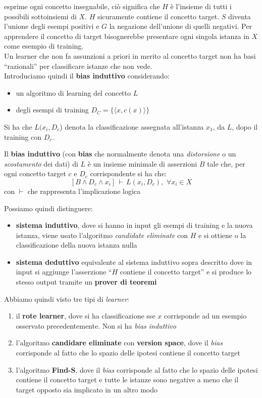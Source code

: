 \documentclass[a4paper,12pt, oneside]{book}
\begin{document}
esprime ogni concetto insegnabile, ciò significa che $H$ è l'insieme di tutti i
possibili sottoinsiemi di $X$. $H$ sicuramente contiene il concetto target. $S$
diventa l'unione degli esempi positivi e $G$ la negazione dell'unione di quelli
negativi. Per apprendere il concetto di target bisognerebbe presentare ogni
singola istanza in $X$ come esempio di training.\\
Un learner che non fa assunzioni a priori in merito al concetto target non ha
basi ``razionali'' per classificare istanze che non vede.\\
Introduciamo quindi il \textbf{bias induttivo} considerando:
\begin{itemize}
  \item un algoritmo di learning del concetto $L$
  \item degli esempi di training $D_C=\{\langle x,c(x)\rangle\}$
\end{itemize}
Si ha che $L(x_i,D_c$) denota la classificazione assegnata all'istanza $x_1$, da
$L$, dopo il training con $D_c$.
\begin{definizione}
  Il \textbf{bias induttivo} (con \textbf{bias} che normalmente denota una
  \emph{distorsione} o un \emph{scostamento} dei dati) di $L$ è un insieme
  minimale di asserzioni $B$ tale 
  che, per ogni concetto target $c$ e $D_c$ corrispondente si ha che:
  \[[B\land D_c\land x_i]\,\vdash\,L(x_i,D_c),\,\,\forall x_i\in X\]
  con $\vdash$ che rappresenta l'implicazione logica
\end{definizione}
Possiamo quindi distinguere:
\begin{itemize}
  \item \textbf{sistema induttivo}, dove si hanno in input gli esempi di
  training e la nuova istanza, viene usato l'algoritmo \textit{candidate
    eliminate} con $H$ e si ottiene o la classificazione della nuova istanza
  nulla
  \item \textbf{sistema deduttivo} equivalente al sistema induttivo sopra
  descritto dove in input si aggiunge l'asserzione ``$H$ contiene il concetto
  target'' e si produce lo stesso output tramite un \textbf{prover di teoremi}
\end{itemize}
Abbiamo quindi visto tre tipi di \textit{learner}:
\begin{enumerate}
  \item il \textbf{rote learner}, dove si ha classificazione sse $x$ corrisponde
  ad un esempio osservato precedentemente. Non si ha \textit{bias induttivo}
  \item l'algoritmo \textbf{candidare eliminate} con \textbf{version space},
  dove il \textit{bias} corrisponde al fatto che lo spazio delle ipotesi
  contiene il concetto target 
  \item l'algoritmo \textbf{Find-S}, dove il \textit{bias} corrisponde al fatto
  che lo spazio delle ipotesi contiene il concetto target e tutte le istanze
  sono negative a meno che il target opposto sia implicato in un altro modo 
\end{enumerate}
\end{document}
